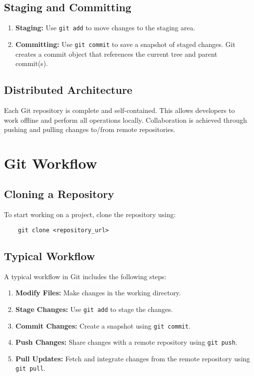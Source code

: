 \subsection{Staging and Committing}
\begin{enumerate}
    \item \textbf{Staging:} Use \texttt{git add} to move changes to the staging area.
    \item \textbf{Committing:} Use \texttt{git commit} to save a snapshot of staged changes. Git creates a commit object that references the current tree and parent commit(s).
\end{enumerate}

\subsection{Distributed Architecture}
Each Git repository is complete and self-contained. This allows developers to work offline and perform all operations locally. Collaboration is achieved through pushing and pulling changes to/from remote repositories.

\section{Git Workflow}

\subsection{Cloning a Repository}
To start working on a project, clone the repository using:
\begin{verbatim}
    git clone <repository_url>
\end{verbatim}

\subsection{Typical Workflow}
A typical workflow in Git includes the following steps:
\begin{enumerate}
    \item \textbf{Modify Files:} Make changes in the working directory.
    \item \textbf{Stage Changes:} Use \texttt{git add} to stage the changes.
    \item \textbf{Commit Changes:} Create a snapshot using \texttt{git commit}.
    \item \textbf{Push Changes:} Share changes with a remote repository using \texttt{git push}.
    \item \textbf{Pull Updates:} Fetch and integrate changes from the remote repository using \texttt{git pull}.
\end{enumerate}

